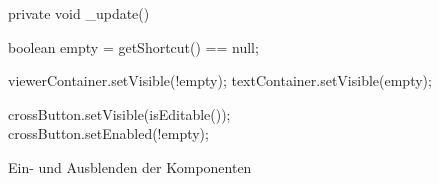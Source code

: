 \begin{wrapfigure}[11]{l}[0cm]{0.50\textwidth}
    \centering
	\vspace{-5px}
	\begin{spacing}{0.75}
		\begin{javacode}[firstnumber=205]
private void _update()
{
  boolean empty = getShortcut() == null;
	
  viewerContainer.setVisible(!empty);
  textContainer.setVisible(empty);
  
  crossButton.setVisible(isEditable());
  crossButton.setEnabled(!empty);
}		\end{javacode}
	\end{spacing}
	\caption{Ein- und Ausblenden der Komponenten}
	\label{fig:ShortcutField-update}
\end{wrapfigure}